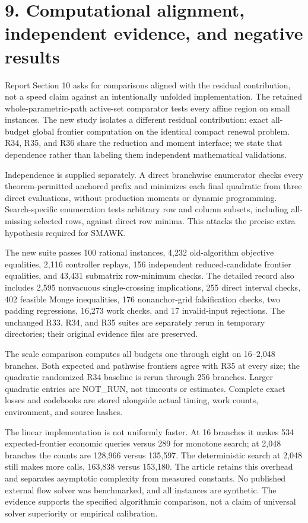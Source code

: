 \documentclass[11pt,letterpaper]{article}
\begin{document}
\section*{9. Computational alignment, independent evidence, and negative results}

Report Section 10 asks for comparisons aligned with the residual contribution, not a speed claim against an intentionally unfolded implementation. The retained whole-parametric-path active-set comparator tests every affine region on small instances. The new study isolates a different residual contribution: exact all-budget global frontier computation on the identical compact renewal problem. R34, R35, and R36 share the reduction and moment interface; we state that dependence rather than labeling them independent mathematical validations.


Independence is supplied separately. A direct branchwise enumerator checks every theorem-permitted anchored prefix and minimizes each final quadratic from three direct evaluations, without production moments or dynamic programming. Search-specific enumeration tests arbitrary row and column subsets, including all-missing selected rows, against direct row minima. This attacks the precise extra hypothesis required for SMAWK.


The new suite passes 100 rational instances, 4,232 old-algorithm objective equalities, 2,116 controller replays, 156 independent reduced-candidate frontier equalities, and 43,431 submatrix row-minimum checks. The detailed record also includes 2,595 nonvacuous single-crossing implications, 255 direct interval checks, 402 feasible Monge inequalities, 176 nonanchor-grid falsification checks, two padding regressions, 16,273 work checks, and 17 invalid-input rejections. The unchanged R33, R34, and R35 suites are separately rerun in temporary directories; their original evidence files are preserved.


The scale comparison computes all budgets one through eight on 16--2,048 branches. Both expected and pathwise frontiers agree with R35 at every size; the quadratic randomized R34 baseline is rerun through 256 branches. Larger quadratic entries are NOT\_RUN, not timeouts or estimates. Complete exact losses and codebooks are stored alongside actual timing, work counts, environment, and source hashes.


The linear implementation is not uniformly faster. At 16 branches it makes 534 expected-frontier economic queries versus 289 for monotone search; at 2,048 branches the counts are 128,966 versus 135,597. The deterministic search at 2,048 still makes more calls, 163,838 versus 153,180. The article retains this overhead and separates asymptotic complexity from measured constants. No published external flow solver was benchmarked, and all instances are synthetic. The evidence supports the specified algorithmic comparison, not a claim of universal solver superiority or empirical calibration.
\end{document}
